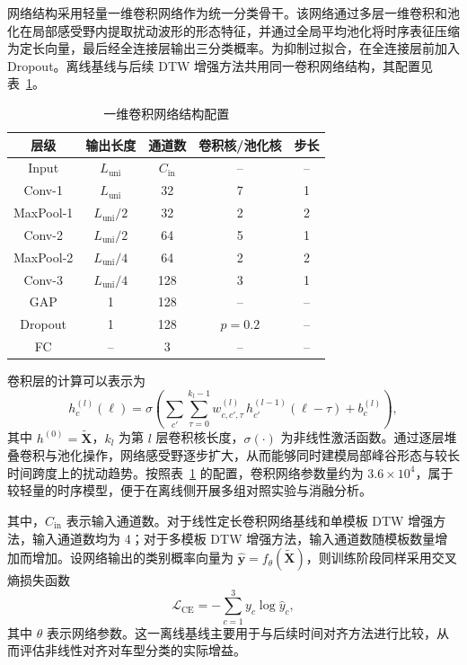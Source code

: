 网络结构采用轻量一维卷积网络作为统一分类骨干。该网络通过多层一维卷积和池化在局部感受野内提取扰动波形的形态特征，并通过全局平均池化将时序表征压缩为定长向量，最后经全连接层输出三分类概率。为抑制过拟合，在全连接层前加入 Dropout。离线基线与后续 DTW 增强方法共用同一卷积网络结构，其配置见表~\ref{tab:ch3_cnn_arch}。

\begin{table}[!htbp]
\centering
\small
\caption{一维卷积网络结构配置}
\label{tab:ch3_cnn_arch}
\begin{tabular}{c c c c c}
\hline
层级 & 输出长度 & 通道数 & 卷积核/池化核 & 步长 \\
\hline
Input & $L_{\mathrm{uni}}$ & $C_{\mathrm{in}}$ & -- & -- \\
Conv-1 & $L_{\mathrm{uni}}$ & 32  & 7 & 1 \\
MaxPool-1 & $L_{\mathrm{uni}}/2$ & 32 & 2 & 2 \\
Conv-2 & $L_{\mathrm{uni}}/2$ & 64  & 5 & 1 \\
MaxPool-2 & $L_{\mathrm{uni}}/4$ & 64 & 2 & 2 \\
Conv-3 & $L_{\mathrm{uni}}/4$ & 128 & 3 & 1 \\
GAP & 1 & 128 & -- & -- \\
Dropout & 1 & 128 & $p=0.2$ & -- \\
FC & -- & 3 & -- & -- \\
\hline
\end{tabular}
\end{table}

卷积层的计算可以表示为
\begin{equation}
    h^{(l)}_{c}(\ell)=\sigma\!\left(\sum_{c'}\sum_{\tau=0}^{k_l-1} w^{(l)}_{c,c',\tau}\,h^{(l-1)}_{c'}(\ell-\tau)+b^{(l)}_{c}\right),
\end{equation}
其中 $h^{(0)}=\tilde{\mathbf{X}}$，$k_l$ 为第 $l$ 层卷积核长度，$\sigma(\cdot)$ 为非线性激活函数。通过逐层堆叠卷积与池化操作，网络感受野逐步扩大，从而能够同时建模局部峰谷形态与较长时间跨度上的扰动趋势。按照表~\ref{tab:ch3_cnn_arch} 的配置，卷积网络参数量约为 $3.6\times 10^{4}$，属于较轻量的时序模型，便于在离线侧开展多组对照实验与消融分析。

其中，$C_{\mathrm{in}}$ 表示输入通道数。对于线性定长卷积网络基线和单模板 DTW 增强方法，输入通道数均为 4；对于多模板 DTW 增强方法，输入通道数随模板数量增加而增加。设网络输出的类别概率向量为 $\hat{\mathbf{y}}=f_{\theta}(\tilde{\mathbf{X}})$，则训练阶段同样采用交叉熵损失函数
\begin{equation}
    \mathcal{L}_{\mathrm{CE}}=-\sum_{c=1}^{3} y_c \log \hat{y}_c,
\end{equation}
其中 $\theta$ 表示网络参数。这一离线基线主要用于与后续时间对齐方法进行比较，从而评估非线性对齐对车型分类的实际增益。

